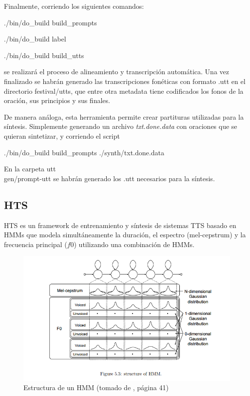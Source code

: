Finalmente, corriendo los siguientes comandos:

\begin{tcolorbox}
./bin/do\_build build\_prompts

./bin/do\_build label

./bin/do\_build build\_utts
\end{tcolorbox}

\noindent se realizará el proceso de alineamiento y transcripción automática. Una vez finalizado se habrán generado las transcripciones fonéticas con formato .utt en el directorio festival/utts, que entre otra metadata tiene codificados los fonos de la oración, sus principios y sus finales.

De manera análoga, esta herramienta permite crear partituras utilizadas para la síntesis. Simplemente generando un archivo \textit{txt.done.data} con oraciones que se quieran sintetizar, y corriendo el script

\begin{tcolorbox}
./bin/do\_build build\_prompts ./synth/txt.done.data
\end{tcolorbox}

En la carpeta utt\\ gen/prompt-utt se habrán generado los .utt necesarios para la síntesis.


\subsection{HTS}


HTS \cite{hts} es un framework de entrenamiento y síntesis de sistemas TTS basado en HMMs que modela simultáneamente la duración, el espectro (mel-cepstrum) y la frecuencia principal ($f0$) utilizando una combinación de HMMs.

\begin{figure}
\includegraphics[scale=0.5]{imagenes/hmm.png}
\caption{Estructura de un HMM (tomado de \cite{phoneticAndProsodic}, página 41)}
\label{hmmStructure}
\centering
\end{figure}

